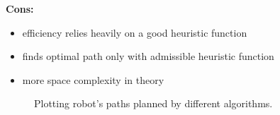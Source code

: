 \documentclass[12pt]{article}
\begin{document}
\begin{enumerate}
\begin{enumerate}
\begin{multicols}{2}
            \textbf{Cons:}
            \begin{itemize}
                \item efficiency relies heavily on a good heuristic function
                \item finds optimal path only with admissible heuristic function
                \item more space complexity in theory
            \end{itemize}

        \end{multicols}
    
        \begin{figure}[h]
            \centering
            \caption{Plotting robot's paths planned by different algorithms.}
            \label{fig:odom_plot}
        \end{figure}


\end{enumerate}
\end{enumerate}
\end{document}
